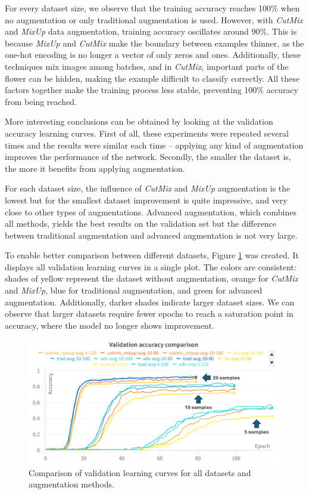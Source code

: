 For every dataset size, we observe that the training accuracy reaches 100\% when no augmentation or only traditional augmentation is used. However, with \textit{CutMix} and \textit{MixUp} data augmentation, training accuracy oscillates around 90\%. This is because \textit{MixUp} and \textit{CutMix} make the boundary between examples thinner, as the one-hot encoding is no longer a vector of only zeros and ones. Additionally, these techniques mix images among batches, and in \textit{CutMix}, important parts of the flower can be hidden, making the example difficult to classify correctly. All these factors together make the training process less stable, preventing 100\% accuracy from being reached.


More interesting conclusions can be obtained by looking at the validation accuracy learning curves. First of all, these experiments were repeated several times and the results were similar each time -- applying any kind of augmentation improves the performance of the network. Secondly, the smaller the dataset is, the more it benefits from applying augmentation.

For each dataset size, the influence of \textit{CutMix} and \textit{MixUp} augmentation is the lowest but for the smallest dataset improvement is quite impressive, and very close to other types of augmentations. Advanced augmentation, which combines all methods, yields the best results on the validation set but the difference between traditional augmentation and advanced augmentation is not very large. 

To enable better comparison between different datasets, Figure \ref{fig:oneshotLCSummary} was created. It displays all validation learning curves in a single plot. The colors are consistent: shades of yellow represent the dataset without augmentation, orange for \textit{CutMix} and \textit{MixUp}, blue for traditional augmentation, and green for advanced augmentation. Additionally, darker shades indicate larger dataset sizes. We can observe that larger datasets require fewer epochs to reach a saturation point in accuracy, where the model no longer shows improvement.

\begin{figure}[!h]
    \centering
    \includegraphics[width=\textwidth]{Images/oneshot/lc/summary_val_acc_improved2.png}
    \caption{Comparison of validation learning curves for all datasets and augmentation methods.}
    \label{fig:oneshotLCSummary}
\end{figure}

